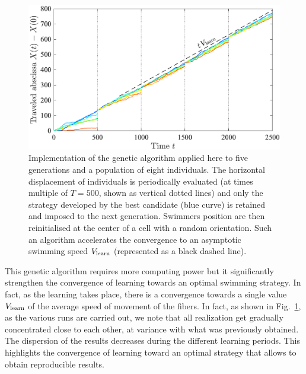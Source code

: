 \documentclass[aps,pre,reprint,superscriptaddress]{revtex4-2}
\begin{document}
\begin{figure}[ht]
  \centerline{\includegraphics[width=\columnwidth]{genetic_learning}}
  \caption{\label{fig:genetic_learning} Implementation of the genetic algorithm  applied here to five generations and a population of eight individuals. The horizontal displacement of individuals is periodically evaluated (at times multiple of $T=500$, shown as vertical dotted lines) and only the strategy developed by the best candidate (blue curve) is retained and imposed to the next generation. Swimmers position are then reinitialised at the center of a cell with a random orientation. Such an algorithm accelerates the convergence to an asymptotic swimming speed $V_{\rm learn}$ (represented as a black dashed line). }
\end{figure}

This genetic algorithm requires more computing power but it significantly strengthen the convergence of learning towards an optimal swimming strategy. In fact, as the learning takes place, there is a convergence towards a single value $V_{\rm learn}$ of the average speed of movement of the fibers. In fact, as shown in Fig.~\ref{fig:genetic_learning}, as the various runs are carried out, we note that all realization get gradually concentrated close to each other, at variance with what was previously obtained. The dispersion of the results decreases during the different learning periods. This highlights the convergence of learning toward an optimal strategy that allows to obtain reproducible results.
\end{document}
